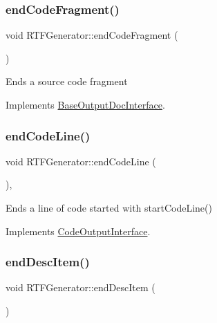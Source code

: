 \mbox{\label{class_r_t_f_generator_ae75111adf81a1179b924ab7656d8c74c}} 
\subsubsection{\texorpdfstring{endCodeFragment()}{endCodeFragment()}}
{\footnotesize\ttfamily void R\+T\+F\+Generator\+::end\+Code\+Fragment (\begin{DoxyParamCaption}{ }\end{DoxyParamCaption})\hspace{0.3cm}{\ttfamily [virtual]}}

Ends a source code fragment 

Implements \mbox{\hyperlink{class_base_output_doc_interface_a08f032482a8f23ac1aab66552db43a81}{Base\+Output\+Doc\+Interface}}.

\mbox{\label{class_r_t_f_generator_a3f63e2fedfb61f656e35df2054a6d772}} 
\subsubsection{\texorpdfstring{endCodeLine()}{endCodeLine()}}
{\footnotesize\ttfamily void R\+T\+F\+Generator\+::end\+Code\+Line (\begin{DoxyParamCaption}{ }\end{DoxyParamCaption})\hspace{0.3cm}{\ttfamily [inline]}, {\ttfamily [virtual]}}

Ends a line of code started with start\+Code\+Line() 

Implements \mbox{\hyperlink{class_code_output_interface_afac5763eafc78f93b82691fb9a6dcff7}{Code\+Output\+Interface}}.

\mbox{\label{class_r_t_f_generator_aaeb8cbfab437b4198548c4f06dc12847}} 
\subsubsection{\texorpdfstring{endDescItem()}{endDescItem()}}
{\footnotesize\ttfamily void R\+T\+F\+Generator\+::end\+Desc\+Item (\begin{DoxyParamCaption}{ }\end{DoxyParamCaption})\hspace{0.3cm}{\ttfamily [virtual]}}

